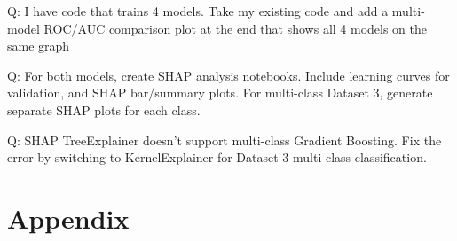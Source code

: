 \documentclass[11pt]{article}
\begin{document}
Q: I have code that trains 4 models. Take my existing code and add a multi-model ROC/AUC comparison plot at the end that shows all 4 models on the same graph

Q: For both models, create SHAP analysis notebooks. Include learning curves for validation, and SHAP bar/summary plots. For multi-class Dataset 3, generate separate SHAP plots for each class.

Q: SHAP TreeExplainer doesn't support multi-class Gradient Boosting. Fix the error by switching to KernelExplainer for Dataset 3 multi-class classification.





\newpage


\FloatBarrier





\newpage
\appendix
\section {Appendix}


\newpage
\end{document}
